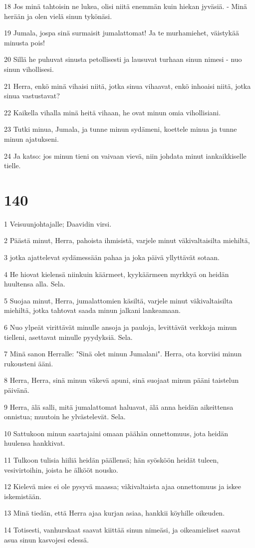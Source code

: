 \par 18 Jos minä tahtoisin ne lukea, olisi niitä enemmän kuin hiekan jyväsiä. - Minä herään ja olen vielä sinun tykönäsi.
\par 19 Jumala, jospa sinä surmaisit jumalattomat! Ja te murhamiehet, väistykää minusta pois!
\par 20 Sillä he puhuvat sinusta petollisesti ja lausuvat turhaan sinun nimesi - nuo sinun vihollisesi.
\par 21 Herra, enkö minä vihaisi niitä, jotka sinua vihaavat, enkö inhoaisi niitä, jotka sinua vastustavat?
\par 22 Kaikella vihalla minä heitä vihaan, he ovat minun omia vihollisiani.
\par 23 Tutki minua, Jumala, ja tunne minun sydämeni, koettele minua ja tunne minun ajatukseni.
\par 24 Ja katso: jos minun tieni on vaivaan vievä, niin johdata minut iankaikkiselle tielle.

\chapter{140}

\par 1 Veisuunjohtajalle; Daavidin virsi.
\par 2 Päästä minut, Herra, pahoista ihmisistä, varjele minut väkivaltaisilta miehiltä,
\par 3 jotka ajattelevat sydämessään pahaa ja joka päivä yllyttävät sotaan.
\par 4 He hiovat kielensä niinkuin käärmeet, kyykäärmeen myrkkyä on heidän huultensa alla. Sela.
\par 5 Suojaa minut, Herra, jumalattomien käsiltä, varjele minut väkivaltaisilta miehiltä, jotka tahtovat saada minun jalkani lankeamaan.
\par 6 Nuo ylpeät virittävät minulle ansoja ja pauloja, levittävät verkkoja minun tielleni, asettavat minulle pyydyksiä. Sela.
\par 7 Minä sanon Herralle: "Sinä olet minun Jumalani". Herra, ota korviisi minun rukousteni ääni.
\par 8 Herra, Herra, sinä minun väkevä apuni, sinä suojaat minun pääni taistelun päivänä.
\par 9 Herra, älä salli, mitä jumalattomat haluavat, älä anna heidän aikeittensa onnistua; muutoin he ylvästelevät. Sela.
\par 10 Sattukoon minun saartajaini omaan päähän onnettomuus, jota heidän huulensa hankkivat.
\par 11 Tulkoon tulisia hiiliä heidän päällensä; hän syösköön heidät tuleen, vesivirtoihin, joista he älkööt nousko.
\par 12 Kielevä mies ei ole pysyvä maassa; väkivaltaista ajaa onnettomuus ja iskee iskemistään.
\par 13 Minä tiedän, että Herra ajaa kurjan asiaa, hankkii köyhille oikeuden.
\par 14 Totisesti, vanhurskaat saavat kiittää sinun nimeäsi, ja oikeamieliset saavat asua sinun kasvojesi edessä.

